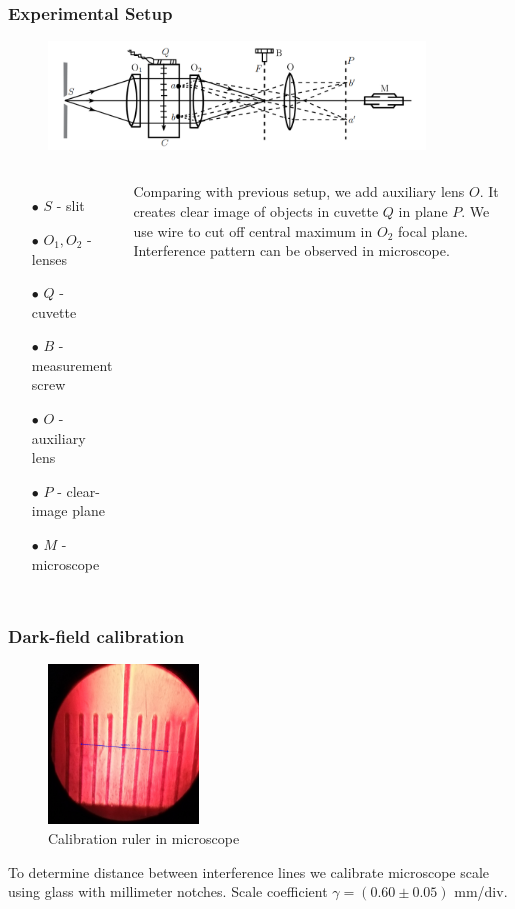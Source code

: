\documentclass{beamer}
\begin{document}
	\begin{frame}
		\frametitle{Experimental Setup}
		\begin{figure}
			\centering
			\includegraphics[width=10cm]{res/setup2.png}
		\end{figure}
		
		\begin{columns}
			\begin{enumerate}
				\item[$\bullet$] $S$ - slit
				\item[$\bullet$] $O_1, O_2$ - lenses
				\item[$\bullet$] $Q$ - cuvette
				\item[$\bullet$] $B$ - measurement screw
				\item[$\bullet$] $O$ - auxiliary lens
				\item[$\bullet$] $P$ - clear-image plane
				\item[$\bullet$] $M$ - microscope
			\end{enumerate}
			Comparing with previous setup, we add auxiliary lens $O$. It creates clear image of objects in cuvette $Q$ in plane $P$. We use wire to cut off central maximum in $O_2$ focal plane. Interference pattern can be observed in microscope.
		\end{columns}
	\end{frame}
	
	\begin{frame}
		\frametitle{Dark-field calibration}
		
		\begin{figure}
			\includegraphics[width=4cm]{data/part2/ruler.jpg}
			\caption{Calibration ruler in microscope}
		\end{figure}
	
		To determine distance between interference lines we calibrate microscope scale using glass with millimeter notches. Scale coefficient $\gamma = (0.60 \pm 0.05)$ mm/div.
		
	\end{frame}
	
\end{document}
